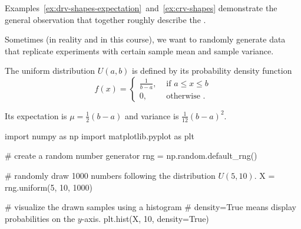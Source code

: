\documentclass[../main.tex]{subfiles}
\begin{document}
\clearpage

Examples~\ref{ex:drv-shapes-expectation}~and~\ref{ex:crv-shapes} demonstrate the general observation that  together roughly describe the .  

Sometimes (in reality and in this course), we want to randomly generate data that replicate experiments with certain sample mean and sample variance.

\begin{definition}
  The uniform distribution \(U(a,b)\) is defined by its probability density function
  \[
    f(x) = 
    \begin{cases}
      \frac{1}{b-a}, &\text{ if } a \le x \le b \\[2ex]
      0,            &\text{ otherwise }.
    \end{cases}
  \]

  Its expectation is \(\mu = \frac{1}{2}(b - a)\) and variance is \(\frac{1}{12}(b - a)^{2}\).
\end{definition}

\begin{center}
\end{center}


\begin{listing}[h!]
  \begin{pythoncode}
import numpy as np
import matplotlib.pyplot as plt

# create a random number generator
rng = np.random.default_rng()

# randomly draw 1000 numbers following the distribution $U(5,10)$.
X = rng.uniform(5, 10, 1000)

# visualize the drawn samples using a histogram
# density=True means display probabilities on the $y$-axis.
plt.hist(X, 10, density=True)
  \end{pythoncode}

  \caption{Python code for random number generation following \(U(a,b)\)}
  \label{lst:pseudorandom-number-generator-expectation}
\end{listing}
\end{document}
